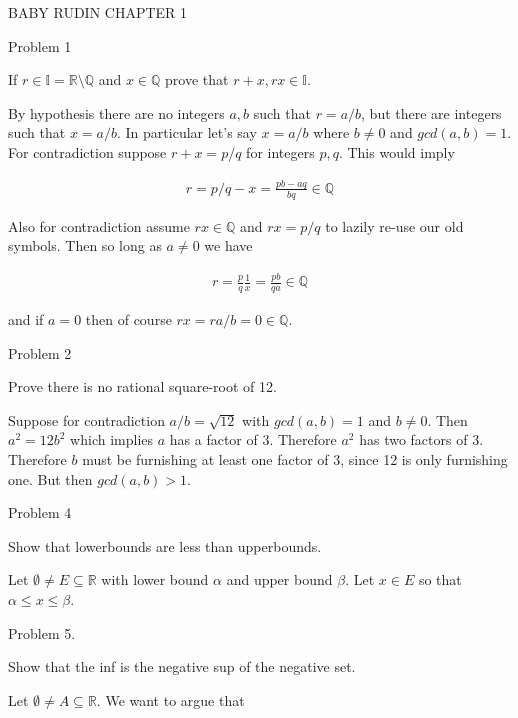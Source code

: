\documentclass{article}
\begin{document}
	\begin{center}
		\LARGE BABY RUDIN CHAPTER 1
	\end{center}

	{\Large Problem 1

	 If $r\in\mathbb{I}=\mathbb{R}\setminus \mathbb{Q}$ and $x\in\mathbb{Q}$ prove that $r+x, rx \in\mathbb{I}$.}

	By hypothesis there are no integers $a,b$ such that $r=a/b$, but there are integers such that $x=a/b$.  In particular let's say $x=a/b$ where $b\ne 0$ and $gcd(a,b)=1$.  For contradiction suppose $r+x = p/q$ for integers $p,q$.  This would imply

	\begin{align*}
		r = p/q - x = \frac{pb-aq}{bq} \in \mathbb{Q}
	\end{align*}

	Also for contradiction assume $rx\in \mathbb{Q}$ and $rx = p/q$ to lazily re-use our old symbols.  Then so long as $a\ne 0$ we have

	\begin{align*}
		r = \frac{p}{q}\frac{1}{x} = \frac{pb}{qa} \in \mathbb{Q}
	\end{align*}

	and if $a=0$ then of course $rx = ra/b = 0\in\mathbb{Q}$.

	\pagebreak

	{\Large Problem 2

	Prove there is no rational square-root of 12.}

	Suppose for contradiction $a/b=\sqrt{12}$ with $gcd(a,b)=1$ and $b\ne 0$.  Then $a^2 = 12b^2$ which implies $a$ has a factor of 3.  Therefore $a^2$ has two factors of 3.  Therefore $b$ must be furnishing at least one factor of 3, since 12 is only furnishing one.  But then $gcd(a,b) > 1$.
	
	\pagebreak

	{\Large Problem 4

	Show that lowerbounds are less than upperbounds.}

	Let $\emptyset \ne E \subseteq \mathbb{R}$ with lower bound $\alpha$ and upper bound $\beta$.  Let $x\in E$ so that $\alpha\leq x\leq \beta$.
	
	\pagebreak

	{\Large Problem 5.

	Show that the inf is the negative sup of the negative set.}

	Let $\emptyset \ne A \subseteq \mathbb{R}$.  We want to argue that
\end{document}

